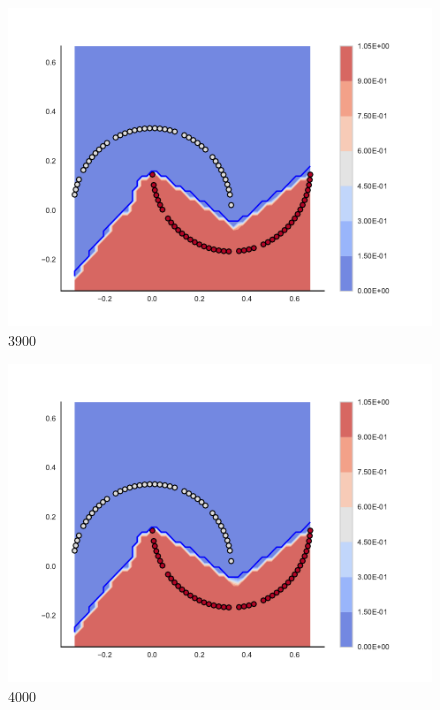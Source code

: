 \begin{subfigure}[b]{0.09\textwidth}
    \includegraphics[clip, trim=2.35cm 1.75cm 4.5cm 0cm,width=\textwidth]{img/convergence/3900.pdf}
    \caption{3900}
    \label{fig:convergence_3900}
\end{subfigure}
%
\begin{subfigure}[b]{0.09\textwidth}
    \includegraphics[clip, trim=2.35cm 1.75cm 4.5cm 0cm,width=\textwidth]{img/convergence/4000.pdf}
    \caption{4000}
    \label{fig:convergence_4000}
\end{subfigure}
%
